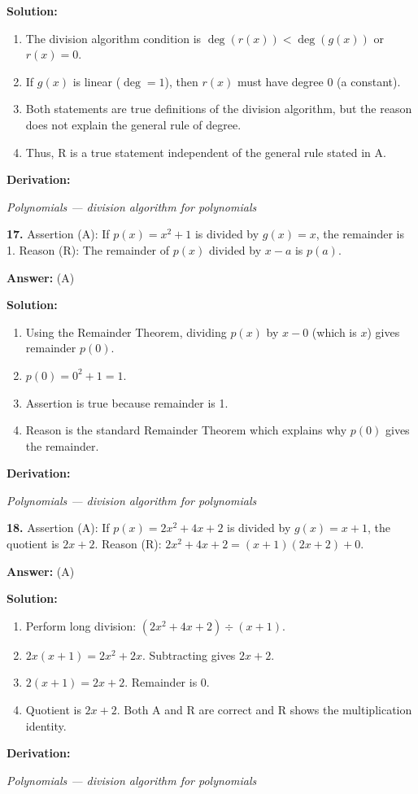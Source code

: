 \documentclass[12pt,a4paper]{exam}
\newcommand{\fitmath}[1]{%
  \sbox{\schmathbox}{$\displaystyle #1$}%
  \ifdim\wd\schmathbox>\linewidth
    \resizebox{\linewidth}{!}{\usebox{\schmathbox}}%
  \else
    \usebox{\schmathbox}%
  \fi}
\begin{document}
\begin{questions}
\textbf{Solution:}
\begin{enumerate}
  \item The division algorithm condition is $\deg(r(x)) < \deg(g(x))$ or $r(x) = 0$.
  \item If $g(x)$ is linear ($\deg=1$), then $r(x)$ must have degree 0 (a constant).
  \item Both statements are true definitions of the division algorithm, but the reason does not explain the general rule of degree.
  \item Thus, R is a true statement independent of the general rule stated in A.
\end{enumerate}
\textbf{Derivation:}
\begin{center}
\fitmath{\deg(r(x)) < \deg(g(x))}
\end{center}
\hfill \textit{Polynomials — division algorithm for polynomials}
\vspace{0.3cm}

\question \textbf{17.} Assertion (A): If $p(x) = x^2 + 1$ is divided by $g(x) = x$, the remainder is 1. Reason (R): The remainder of $p(x)$ divided by $x-a$ is $p(a)$.

\textbf{Answer:}
(A)

\textbf{Solution:}
\begin{enumerate}
  \item Using the Remainder Theorem, dividing $p(x)$ by $x-0$ (which is $x$) gives remainder $p(0)$.
  \item $p(0) = 0^2 + 1 = 1$.
  \item Assertion is true because remainder is 1.
  \item Reason is the standard Remainder Theorem which explains why $p(0)$ gives the remainder.
\end{enumerate}
\textbf{Derivation:}
\begin{center}
\fitmath{p(0) = 0^2 + 1 = 1}
\end{center}
\hfill \textit{Polynomials — division algorithm for polynomials}
\vspace{0.3cm}

\question \textbf{18.} Assertion (A): If $p(x) = 2x^2 + 4x + 2$ is divided by $g(x) = x+1$, the quotient is $2x+2$. Reason (R): $2x^2 + 4x + 2 = (x+1)(2x+2) + 0$.

\textbf{Answer:}
(A)

\textbf{Solution:}
\begin{enumerate}
  \item Perform long division: $(2x^2 + 4x + 2) \div (x+1)$.
  \item $2x(x+1) = 2x^2 + 2x$. Subtracting gives $2x + 2$.
  \item $2(x+1) = 2x + 2$. Remainder is 0.
  \item Quotient is $2x+2$. Both A and R are correct and R shows the multiplication identity.
\end{enumerate}
\textbf{Derivation:}
\begin{center}
\fitmath{(x+1)(2x+2) = 2x^2 + 2x + 2x + 2 = 2x^2 + 4x + 2}
\end{center}
\hfill \textit{Polynomials — division algorithm for polynomials}
\vspace{0.3cm}


\end{questions}
\end{document}

